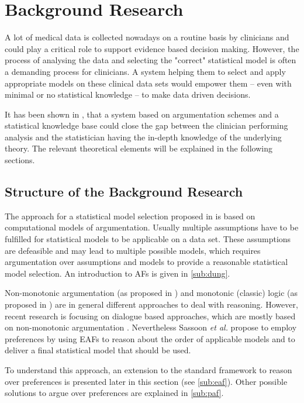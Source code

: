 \section{Background Research}
\label{sec:background}

A lot of medical data is collected nowadays on a routine basis by clinicians and could play a critical role to support evidence based decision making. However, the process of analysing the data and selecting the "correct" statistical model is often a demanding process for clinicians. A system helping them to select and apply appropriate models on these clinical data sets would empower them -- even with minimal or no statistical knowledge -- to make data driven decisions. 

It has been shown in \cite{sassoon2014}, that a system based on argumentation schemes and a statistical knowledge base could close the gap between the clinician performing analysis and the statistician having the in-depth knowledge of the underlying theory. The relevant theoretical elements will be explained in the following sections.


\subsection{Structure of the Background Research}

The approach for a statistical model selection proposed in \cite{sassoon2014} is based on computational models of argumentation. Usually multiple assumptions have to be fulfilled for statistical models to be applicable on a data set. These assumptions are defeasible and may lead to multiple possible models, which requires argumentation over assumptions and models to provide a reasonable statistical model selection. An introduction to \glspl{AF} is given in \autoref{sub:dung}. 

Non-monotonic argumentation (as proposed in \cite{dung1995,liao}) and monotonic (classic) logic (as proposed in \cite{Reiter1980}) are in general different approaches to deal with reasoning. However, recent research is focusing on dialogue based approaches, which are mostly based on non-monotonic argumentation \cite{parsons2000,Walton1995}. 
Nevertheless Sassoon \textit{et al.} propose to employ preferences by using \glspl{EAF} to reason about the order of applicable models and to deliver a final statistical model that should be used. 

To understand this approach, an extension to the standard framework to reason over preferences is presented later in this section (see \autoref{sub:eaf}). Other possible solutions to argue over preferences are explained in \autoref{sub:paf}.

